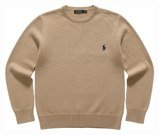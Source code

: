 \documentclass[10pt]{article}
\begin{document}
\begin{minipage}[c][64.75mm][c]{64.75mm}
\end{minipage} \hspace*{6.00mm} \begin{minipage}[c][64.75mm][c]{64.75mm}\centering
\includegraphics[width=64.75mm,height=64.75mm,keepaspectratio]{assets/midlayer/beige-polo-crewneck.png}\
\end{minipage}\
\vspace*{6.00mm}\
\end{document}
